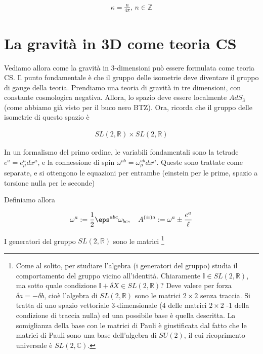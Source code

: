 \documentclass{report}
\begin{document}
\begin{align}
    \kappa = \frac{n}{4\pi}, \, n \in \mathbb{Z}
\end{align}

\section{La gravità in 3D come teoria CS}

Vediamo allora come la gravità in 3-dimensioni può essere formulata come teoria CS. Il punto fondamentale è che il gruppo delle isometrie deve diventare il gruppo di gauge della teoria. Prendiamo una teoria di gravità in tre dimensioni, con constante cosmologica negativa. Allora, lo spazio deve essere localmente \(AdS_3\) (come abbiamo già visto per il buco nero BTZ). Ora, ricorda che il gruppo delle isometrie di questo spazio è 

\begin{align}
    SL(2, \mathbb{R}) \times SL(2, \mathbb{R}) 
\end{align}

In un formalismo del primo ordine, le variabili fondamentali sono la tetrade \(e^a = e^a_\mu dx^\mu\), e la connessione di spin \(\omega^{ab} = \omega^{ab}_\mu dx^\mu\). Queste sono trattate come separate, e si ottengono le equazioni per entrambe (einstein per le prime, spazio a torsione nulla per le seconde)

Definiamo allora 

\begin{align}
    \omega^a := \frac{1}{2}\eps^{abc}\omega_{bc}, \quad A^{(\pm)a} := \omega^a \pm \frac{e^a}{\ell}
\end{align}

I generatori del gruppo \(SL(2, \mathbb{R})\) sono le matrici \footnote{Come al solito, per studiare l'algebra (i generatori del gruppo) studia il comportamento del gruppo vicino all'identità. Chiaramente \(\mathbb{I} \in SL(2, \mathbb{R})\), ma sotto quale condizione \(\mathbb{I} + \delta X \in SL(2, \mathbb{R})\)? Deve valere per forza \(\delta a = -\delta b\), cioè l'algebra di \(SL(2, \mathbb{R})\) sono le matrici \(2\times 2\) senza traccia. Si tratta di uno spazio vettoriale 3-dimensionale (4 delle matrici \(2\times 2\) -1 della condizione di traccia nulla) ed una possibile base è quella descritta. La somiglianza della base con le matrici di Pauli è giustificata dal fatto che le matrici di Pauli sono una base dell'algebra di \(SU(2)\), il cui ricoprimento universale è \(SL(2, \mathbb{C})\).}
\end{document}
